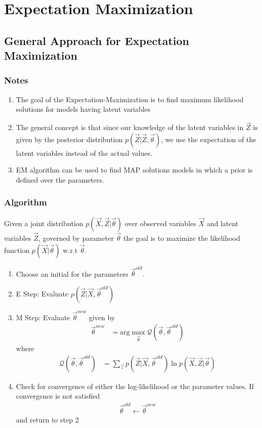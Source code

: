 \documentclass[12pt,twoside]{article}
\begin{document}



\section{Expectation Maximization}

\subsection{General Approach for Expectation Maximization}
\subsubsection{Notes}
\begin{enumerate}
	\item The goal of the Expectation-Maximization is to find maximum likelihood solutions for models having latent variables
	\item The general concept is that since our knowledge of the latent variables in $\vec{Z}$ is given by the posterior distribution $p(\vec{Z}\vert \vec{Z}, \vec{\theta})$, we use the expectation of the latent variables instead of the actual values.
	\item EM algorithm can be used to find MAP solutions models in which a prior is defined over the parameters.
\end{enumerate}

\subsubsection{Algorithm}
Given a joint distribution $p(\vec{X}, \vec{Z}\vert \vec{\theta})$ over observed variables $\vec{X}$ and latent variables $\vec{Z}$, governed by parameter $\vec{\theta}$ the goal is to maximize the likelihood function $p(\vec{X}\vert \vec{\theta})$ w.r.t $\vec{\theta}$.
	\begin{enumerate}
		\item Choose an initial for the parameters $\vec{\theta}^{old}$.
		\item E Step: Evaluate $p(\vec{Z} \vert \vec{X}, \vec{\theta}^{old})$
		\item M Step: Evaluate $\vec{\theta}^{new}$ given by
			\begin{align*}
				\vec{\theta}^{new}& = \text{arg} \max_{\vec{\theta}} \mathcal{Q}(\vec{\theta},\vec{\theta}^{old})
			\end{align*}
		where
			\begin{align*}
				\mathcal{Q}(\vec{\theta},\vec{\theta}^{old})& = \sum_{\vec{z}}p(\vec{Z}\vert \vec{X}, \vec{\theta}^{old})\ln p(\vec{X}, \vec{Z} \vert \vec{\theta})
			\end{align*}
		\item Check for convergence of either the log-likelihood or the parameter values. If convergence is not satisfied
				\begin{align*}
					\vec{\theta}^{old} \leftarrow \vec{\theta}^{new}
				\end{align*}
		and return to step 2
\end{enumerate}
\end{document}
